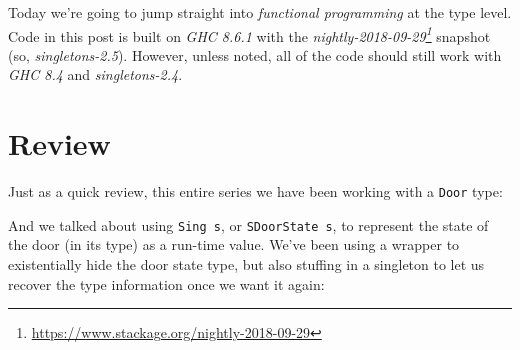 \documentclass[]{article}
\newenvironment{Shaded}{}{}
\newcommand{\CommentTok}[1]{\textcolor[rgb]{0.38,0.63,0.69}{\textit{#1}}}
\newcommand{\DataTypeTok}[1]{\textcolor[rgb]{0.56,0.13,0.00}{#1}}
\newcommand{\KeywordTok}[1]{\textcolor[rgb]{0.00,0.44,0.13}{\textbf{#1}}}
\newcommand{\NormalTok}[1]{#1}
\newcommand{\OperatorTok}[1]{\textcolor[rgb]{0.40,0.40,0.40}{#1}}
\newcommand{\OtherTok}[1]{\textcolor[rgb]{0.00,0.44,0.13}{#1}}
\renewcommand{\href}[2]{#2\footnote{\url{#1}}}
\begin{document}
Today we're going to jump straight into \emph{functional programming} at the
type level. Code in this post is built on \emph{GHC 8.6.1} with the
\emph{\href{https://www.stackage.org/nightly-2018-09-29}{nightly-2018-09-29}}
snapshot (so, \emph{singletons-2.5}). However, unless noted, all of the code
should still work with \emph{GHC 8.4} and \emph{singletons-2.4}.

\section{Review}\label{review}

Just as a quick review, this entire series we have been working with a
\texttt{Door} type:

\begin{Shaded}
\end{Shaded}

And we talked about using \texttt{Sing\ s}, or \texttt{SDoorState\ s}, to
represent the state of the door (in its type) as a run-time value. We've been
using a wrapper to existentially hide the door state type, but also stuffing in
a singleton to let us recover the type information once we want it again:

\begin{Shaded}
\end{Shaded}
\end{document}
